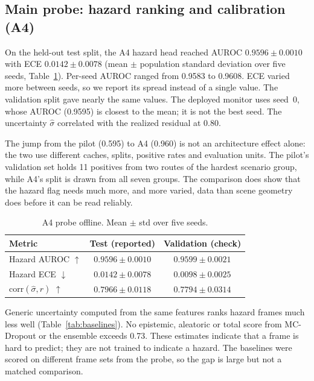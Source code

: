 \documentclass[conference]{IEEEtran}
\newcommand{\sighat}{\hat{\sigma}}
\begin{document}
\subsection{Main probe: hazard ranking and calibration (A4)}
\label{sec:res-offline}

On the held-out test split, the A4 hazard head reached AUROC $0.9596\pm0.0010$ with
ECE $0.0142\pm0.0078$ (mean $\pm$ population standard deviation over five seeds,
Table~\ref{tab:offline}). Per-seed AUROC ranged from 0.9583 to 0.9608. ECE varied
more between seeds, so we report its spread instead of a single value. The
validation split gave nearly the same values. The deployed monitor uses seed~0,
whose AUROC (0.9595) is closest to the mean; it is not the best seed. The
uncertainty $\sighat$ correlated with the realized residual at $0.80$.

The jump from the pilot (0.595) to A4 (0.960) is not an architecture effect alone:
the two use different caches, splits, positive rates and evaluation units. The
pilot's validation set holds 11 positives from two routes of the hardest scenario
group, while A4's split is drawn from all seven groups. The comparison does show
that the hazard flag needs much more, and more varied, data than scene geometry does
before it can be read reliably.

\begin{table}[t]
\centering
\caption{A4 probe offline. Mean $\pm$ std over five seeds.}
\label{tab:offline}
\footnotesize
\begin{tabular}{@{}l c c@{}}
\toprule
Metric & Test (reported) & Validation (check) \\
\midrule
Hazard AUROC $\uparrow$ & $0.9596\pm0.0010$ & $0.9599\pm0.0021$ \\
Hazard ECE $\downarrow$ & $0.0142\pm0.0078$ & $0.0098\pm0.0025$ \\
$\mathrm{corr}(\sighat, r)$ $\uparrow$ & $0.7966\pm0.0118$ & $0.7794\pm0.0314$ \\
\bottomrule
\end{tabular}
\end{table}

Generic uncertainty computed from the same features ranks hazard frames much less
well (Table~\ref{tab:baselines}). No epistemic, aleatoric or total score from
MC-Dropout or the ensemble exceeds 0.73. These estimates indicate that a frame is
hard to predict; they are not trained to indicate a hazard. The baselines were scored
on different frame sets from the probe, so the gap is large but not a matched
comparison.
\end{document}
